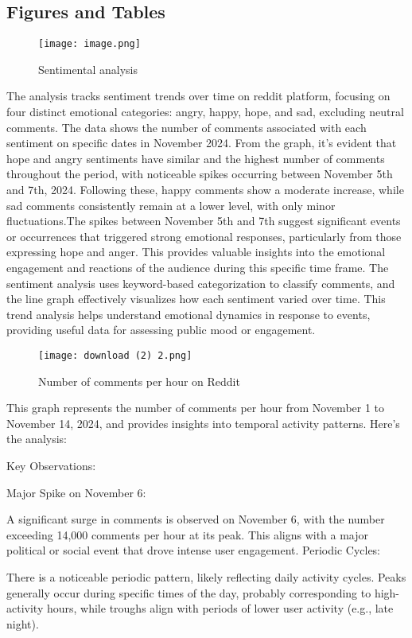 \documentclass[sigconf]{acmart}
\begin{document}
\subsection{Figures and Tables}
\begin{figure}[h]
    \texttt{[image: image.png]}
    \caption{Sentimental analysis}
    \label{fig:toxicity_distribution}
\end{figure}
The analysis tracks sentiment trends over time on reddit platform, focusing on four distinct emotional categories: angry, happy, hope, and sad, excluding neutral comments. The data shows the number of comments associated with each sentiment on specific dates in November 2024. From the graph, it's evident that hope and angry sentiments have similar and the highest number of comments throughout the period, with noticeable spikes occurring between November 5th and 7th, 2024. Following these, happy comments show a moderate increase, while sad comments consistently remain at a lower level, with only minor fluctuations.The spikes between November 5th and 7th suggest significant events or occurrences that triggered strong emotional responses, particularly from those expressing hope and anger. This provides valuable insights into the emotional engagement and reactions of the audience during this specific time frame. The sentiment analysis uses keyword-based categorization to classify comments, and the line graph effectively visualizes how each sentiment varied over time. This trend analysis helps understand emotional dynamics in response to events, providing useful data for assessing public mood or engagement.


\begin{figure}[h]
    \texttt{[image: download (2) 2.png]}
    \caption{Number of comments per hour on Reddit}
    \label{fig:daily_submissions}
\end{figure}
This graph represents the number of comments per hour from November 1 to November 14, 2024, and provides insights into temporal activity patterns. Here's the analysis:

Key Observations:

Major Spike on November 6:

A significant surge in comments is observed on November 6, with the number exceeding 14,000 comments per hour at its peak. This aligns with a major political or social event that drove intense user engagement.
Periodic Cycles:

There is a noticeable periodic pattern, likely reflecting daily activity cycles. Peaks generally occur during specific times of the day, probably corresponding to high-activity hours, while troughs align with periods of lower user activity (e.g., late night).
\end{document}
